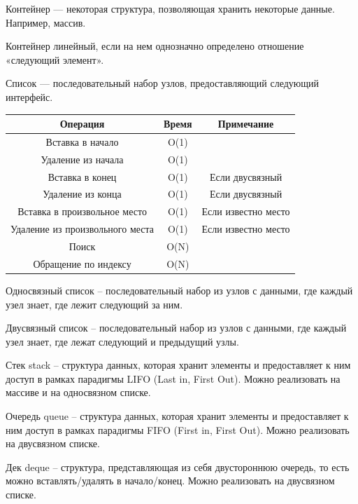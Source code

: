 \Def Контейнер — некоторая структура, позволяющая хранить
некоторые данные. Например, массив.

\Def Контейнер линейный, если на нем однозначно определено
отношение «следующий элемент».

\Def Список — последовательный набор узлов, предоставляющий
следующий интерфейс.

\begin{center}
   \centering
   \begin{tabular}{|c|c|c|}
    \hline
    Операция                        & Время & Примечание          \\ \hline
    Вставка в начало                & O(1)  &                     \\ \hline
    Удаление из начала              & O(1)  &                     \\ \hline
    Вставка в конец                 & O(1)  & Если двусвязный     \\ \hline
    Удаление из конца               & O(1)  & Если двусвязный     \\ \hline
    Вставка в произвольное место    & O(1)  & Если известно место \\ \hline
    Удаление из произвольного места & O(1)  & Если известно место \\ \hline
    Поиск                           & O(N)  &                     \\ \hline
    Обращение по индексу            & O(N)  &                     \\ \hline
    \end{tabular}
\end{center}

\Def Односвязный список -- последовательный набор из узлов с
данными, где каждый узел знает, где лежит следующий за ним.

\Def Двусвязный список -- последовательный набор из узлов с
данными, где каждый узел знает, где лежат следующий и предыдущий
узлы.

\Def Стек stack -- структура данных, которая хранит элементы и
предоставляет к ним доступ в рамках парадигмы LIFO (Last in, First
Out).
Можно реализовать на массиве и на односвязном списке.

\Def Очередь queue -- структура данных, которая хранит элементы и
предоставляет к ним доступ в рамках парадигмы FIFO (First in, First
Out).
Можно реализовать на двусвязном списке.

\Def Дек deque -- структура, представляющая из себя двустороннюю
очередь, то есть можно вставлять/удалять в начало/конец.
Можно реализовать на двусвязном списке.

